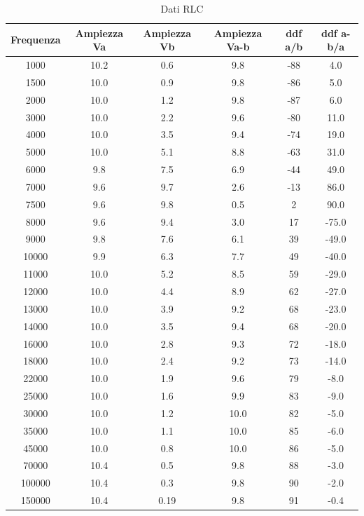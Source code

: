 \documentclass[letterpaper,12pt]{article}
\begin{document}
\begin{table}[htbp]
    \centering
    \caption{Dati RLC}
    \begin{tabular}{cccccc}
        \toprule
        Frequenza & Ampiezza Va & Ampiezza Vb & Ampiezza Va-b & ddf a/b & ddf a-b/a \\
        \midrule
        1000 & 10.2 & 0.6 & 9.8 & -88 & 4.0 \\
        1500 & 10.0 & 0.9 & 9.8 & -86 & 5.0 \\
        2000 & 10.0 & 1.2 & 9.8 & -87 & 6.0 \\
        3000 & 10.0 & 2.2 & 9.6 & -80 & 11.0 \\
        4000 & 10.0 & 3.5 & 9.4 & -74 & 19.0 \\
        5000 & 10.0 & 5.1 & 8.8 & -63 & 31.0 \\
        6000 & 9.8 & 7.5 & 6.9 & -44 & 49.0 \\
        7000 & 9.6 & 9.7 & 2.6 & -13 & 86.0 \\
        7500 & 9.6 & 9.8 & 0.5 & 2 & 90.0 \\
        8000 & 9.6 & 9.4 & 3.0 & 17 & -75.0 \\
        9000 & 9.8 & 7.6 & 6.1 & 39 & -49.0 \\
        10000 & 9.9 & 6.3 & 7.7 & 49 & -40.0 \\
        11000 & 10.0 & 5.2 & 8.5 & 59 & -29.0 \\
        12000 & 10.0 & 4.4 & 8.9 & 62 & -27.0 \\
        13000 & 10.0 & 3.9 & 9.2 & 68 & -23.0 \\
        14000 & 10.0 & 3.5 & 9.4 & 68 & -20.0 \\
        16000 & 10.0 & 2.8 & 9.3 & 72 & -18.0 \\
        18000 & 10.0 & 2.4 & 9.2 & 73 & -14.0 \\
        22000 & 10.0 & 1.9 & 9.6 & 79 & -8.0 \\
        25000 & 10.0 & 1.6 & 9.9 & 83 & -9.0 \\
        30000 & 10.0 & 1.2 & 10.0 & 82 & -5.0 \\
        35000 & 10.0 & 1.1 & 10.0 & 85 & -6.0 \\
        45000 & 10.0 & 0.8 & 10.0 & 86 & -5.0 \\
        70000 & 10.4 & 0.5 & 9.8 & 88 & -3.0 \\
        100000 & 10.4 & 0.3 & 9.8 & 90 & -2.0 \\
        150000 & 10.4 & 0.19 & 9.8 & 91 & -0.4 \\
        \bottomrule
    \end{tabular}
\end{table}
\end{document}
